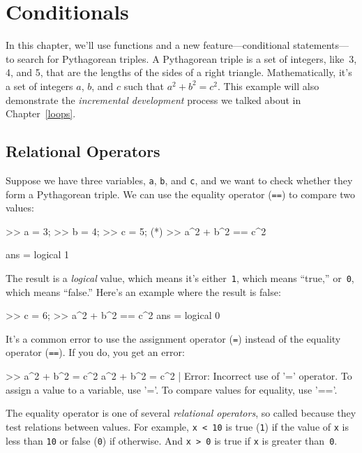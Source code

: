 \chapter{Conditionals}


In this chapter, we'll use functions and a new feature---conditional statements---to search for Pythagorean triples.
A Pytha\-gorean triple is a set of integers, like~3, 4, and 5,
that are the lengths of the sides of a right triangle.  Mathematically, it's a set of integers $a$, $b$, and $c$ such that $a^2 + b^2 = c^2$.
This example will also demonstrate the \emph{incremental development} process we talked about in Chapter~\ref{loops}.


\section{Relational Operators}

Suppose we have three variables, \lstinline{a}, \lstinline{b}, and \lstinline{c}, and we want to check whether they form a Pythagorean triple.  We can use the equality operator (\lstinline{==}) to compare two values:

\begin{code}
>> a = 3;
>> b = 4;
>> c = 5;
(*\pagebreak*)
>> a^2 + b^2 == c^2

ans = logical 1
\end{code}

The result is a \emph{logical} value, which means it's either~\lstinline{1}, which means ``true,'' or~\lstinline{0}, which means ``false.''  Here's an example where the result is false:

\begin{code}
>> c = 6;
>> a^2 + b^2 == c^2
ans = logical 0
\end{code}

It's a common error to use the assignment operator (\lstinline{=}) instead of the equality operator (\lstinline{==}).  If you do, you get an error:

\begin{code}
>> a^2 + b^2 = c^2
 a^2 + b^2 = c^2
           |
Error: Incorrect use of '=' operator. 
To assign a value to a variable, use '='. 
To compare values for equality, use '=='.
\end{code}

The equality operator is one of several \emph{relational operators}, so called because they test relations between values.
For example, \lstinline{x < 10} is true (\lstinline{1}) if the value of \lstinline{x} is less than \lstinline{10} or false (\lstinline{0}) if otherwise.  And \lstinline{x > 0} is true if \lstinline{x} is greater than~\lstinline{0}.

